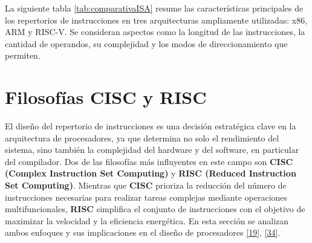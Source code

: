 \documentclass[12pt,oneside]{templates/unerthesis}
\begin{document}
La siguiente tabla \ref{tab:comparativaISA} resume las características principales de los repertorios de instrucciones en tres arquitecturas ampliamente utilizadas: x86, ARM y RISC-V. Se consideran aspectos como la longitud de las instrucciones, la cantidad de operandos, su complejidad y los modos de direccionamiento que permiten.

\begin{table}[!h]
\centering
\caption{\label{tab:comparativaISA}Comparativa de repertorios de instrucciones reales}
\centering
{}
\end{table}

\hypertarget{filosofuxedas-cisc-y-risc}{%
\section{Filosofías CISC y RISC}\label{filosofuxedas-cisc-y-risc}}

El diseño del repertorio de instrucciones es una decisión estratégica clave en la arquitectura de procesadores, ya que determina no solo el rendimiento del sistema, sino también la complejidad del hardware y del software, en particular del compilador. Dos de las filosofías más influyentes en este campo son \textbf{CISC (Complex Instruction Set Computing)} y \textbf{RISC (Reduced Instruction Set Computing)}. Mientras que \textbf{CISC} prioriza la reducción del número de instrucciones necesarias para realizar tareas complejas mediante operaciones multifuncionales, \textbf{RISC} simplifica el conjunto de instrucciones con el objetivo de maximizar la velocidad y la eficiencia energética. En esta sección se analizan ambos enfoques y sus implicaciones en el diseño de procesadores \protect\hyperlink{ref-hennessy2017computer}{{[}19{]}}, \protect\hyperlink{ref-patterson_computer_2014}{{[}34{]}}.
\end{document}
